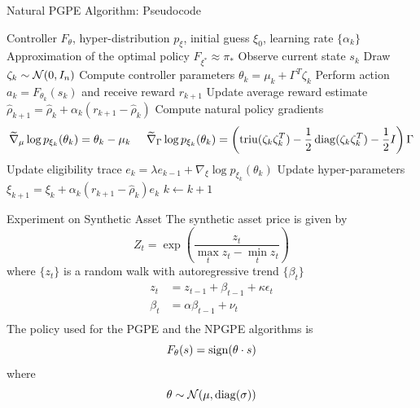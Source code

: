 \begin{frame}{Natural PGPE Algorithm: Pseudocode}
	\begin{algorithmic}[1]
		\Require Controller $F_\theta$, hyper-distribution $p_\xi$, initial guess $\xi_0$, learning rate $\{\alpha_k\}$
		\Ensure Approximation of the optimal policy $F_{\xi^*} \approx \pi_*$
		\Repeat
			\State Observe current state $s_k$
			\State Draw $\zeta_k \sim \mathcal{N}(0, I_n)$
			\State Compute controller parameters $\theta_k = \mu_k + \Gamma^T \zeta_k$
			\State Perform action $a_k = F_{\theta_k}(s_k)$ and receive reward $r_{k+1}$
			\State Update average reward estimate $\widehat{\rho}_{k+1} = \widehat{\rho}_{k} + \alpha_k (r_{k+1} - \widehat{\rho}_{k})$
			\State Compute natural policy gradients
				\begin{equation*}
					\begin{split}
						\widetilde{\nabla}_\mu \log p_{\xi_k}(\theta_k) = \theta_k - \mu_k \;\;\;\;\;
						\widetilde{\nabla}_\Gamma \log p_{\xi_k}(\theta_k) = \left(\operatorname{triu}(\zeta_k \zeta_k^T) - \frac{1}{2} \operatorname{diag}(\zeta_k \zeta_k^T) - \frac{1}{2} I \right) \Gamma
					\end{split}
				\end{equation*}
			\State Update eligibility trace $e_{k} = \lambda e_{k-1} + \nabla_\xi \log p_{\xi_k}(\theta_k)$
			\State Update hyper-parameters $\xi_{k+1} = \xi_k + \alpha_k (r_{k+1} - \widehat{\rho}_{k}) e_k$
			\State $k \leftarrow k + 1$
	\end{algorithmic}
\end{frame}



\begin{frame}{Experiment on Synthetic Asset}
	The synthetic asset price is given by
	\begin{equation*}
		Z_t = \exp\left(\frac{z_t}{\max_t z_t - \min_t z_t}\right)
	\end{equation*}
	where $\{z_t\}$ is a random walk with autoregressive trend $\{\beta_t\}$
		\begin{equation*}
			\begin{split}
				z_t &= z_{t-1} + \beta_{t-1} + \kappa \epsilon_t\\
				\beta_t &= \alpha \beta_{t-1} + \nu_t\\
			\end{split}
		\end{equation*}
	The policy used for the PGPE and the NPGPE algorithms is 
	\begin{equation*}
		F_\theta(s) = \operatorname{sign}(\theta \cdot s)
	\end{equation*}
	where
	\begin{equation*}
		\theta \sim \mathcal{N}(\mu, \operatorname{diag}(\sigma))
	\end{equation*}  
\end{frame}

